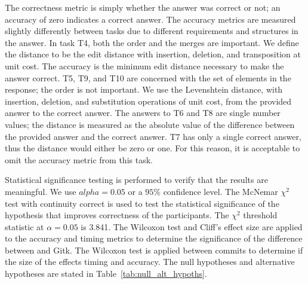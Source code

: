 The correctness metric is simply whether the answer was correct or not;
an accuracy of zero indicates a correct answer. The accuracy metrics are
measured slightly differently between tasks due to different
requirements and structures in the answer. In task T4, both the order
and the merges are important. We define the distance to be the edit
distance with insertion, deletion, and transposition at unit cost. The
accuracy is the minimum edit distance necessary to make the answer
correct. T5, T9, and T10 are concerned with the set of elements in the
response; the order is not important. We use the Levenshtein distance,
with insertion, deletion, and substitution operations of unit cost, from
the provided answer to the correct answer. The answers to T6 and T8 are
single number values; the distance is measured as the absolute value of
the difference between the provided answer and the correct answer. T7
has only a single correct answer, thus the distance would either be zero
or one. For this reason, it is acceptable to omit the accuracy metric
from this task.

Statistical significance testing is performed to verify that the results
are meaningful. We use $alpha = 0.05$ or a $95\%$ confidence level. The
McNemar $\chi^2$ test\cite{McNemar1947} with continuity correct is used
to test the statistical significance of the hypothesis that \tool
improves correctness of the participants. The $\chi^2$ threshold
statistic at $\alpha = 0.05$ is 3.841. The Wilcoxon\cite{Wilcoxon45}
test and Cliff's effect size\cite{Cliff93} are applied to the accuracy
and timing metrics to determine the significance of the difference
between \tool and Gitk. The Wilcoxon test is applied between commits to
determine if the size of the \mt effects timing and accuracy. The
null hypotheses and alternative hypotheses are stated in
Table~\ref{tab:null_alt_hypoths}.

